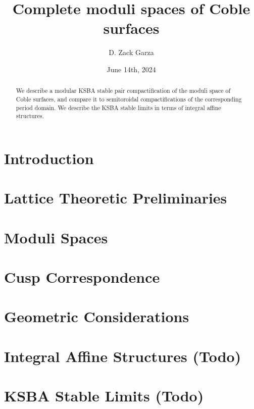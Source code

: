 \documentclass{amsart}
\title{Complete moduli spaces of Coble surfaces}
\date{June 14th, 2024}
\author{D. Zack Garza}
\begin{document}
\begin{abstract}
    We describe a modular KSBA stable pair compactification of the moduli space of Coble surfaces, and compare it to semitoroidal compactifications of the corresponding period domain. We describe the KSBA stable limits in terms of integral affine structures.
    
\end{abstract}

\maketitle

\tableofcontents

\newpage

\section{Introduction}


\section{Lattice Theoretic Preliminaries}


\section{Moduli Spaces}


\section{Cusp Correspondence}


\section{Geometric Considerations}


\section{Integral Affine Structures (Todo)}


\section{KSBA Stable Limits (Todo)}

\end{document}
